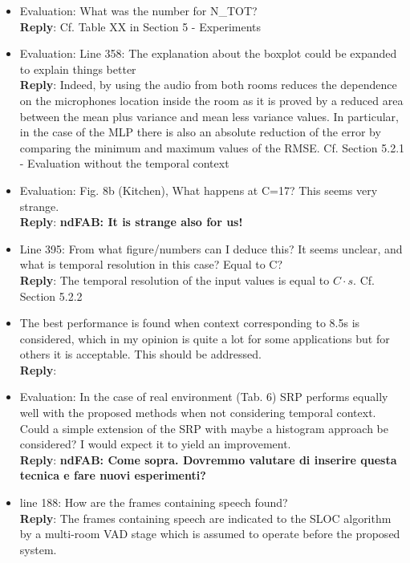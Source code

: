 \documentclass[11pt, technote, letterpaper, oneside, onecolumn]{IEEEtran}
\begin{document}
\begin{itemize}
\item Evaluation: What was the number for N\_TOT?\\
\textbf{Reply}: Cf. Table XX in Section 5 - Experiments

\item Evaluation: Line 358: The explanation about the boxplot could be expanded to explain things better\\
\textbf{Reply}: Indeed, by using the audio from both rooms reduces the dependence on the microphones location inside the room as it is proved by a reduced area between the mean plus variance and mean less variance values. In particular, in the case of the MLP there is also an absolute reduction of the error by comparing the minimum and maximum values of the RMSE. Cf. Section 5.2.1 - Evaluation without the temporal context

\item Evaluation: Fig. 8b (Kitchen), What happens at C=17? This seems very strange.\\
\textbf{Reply}: \textbf{ndFAB: It is strange also for us!}

\item Line 395: From what figure/numbers can I deduce this? It seems unclear, and what is temporal resolution in this case? Equal to C?\\
\textbf{Reply}: The temporal resolution of the input values is equal to $C\cdot s$. Cf. Section 5.2.2 

\item The best performance is found when context corresponding to 8.5s is considered, which in my opinion is quite a lot for some applications but for others it is acceptable. This should be addressed.\\
\textbf{Reply}: 

\item Evaluation: In the case of real environment (Tab. 6) SRP performs equally well with the proposed methods when not considering temporal context. Could a simple extension of the SRP with maybe a histogram approach be considered? I would expect it to yield an improvement.\\
\textbf{Reply}: \textbf{ndFAB: Come sopra. Dovremmo valutare di inserire questa tecnica e fare nuovi esperimenti?}

\item line 188: How are the frames containing speech found?\\
\textbf{Reply}: The frames containing speech are indicated to the SLOC algorithm by a multi-room VAD stage which is assumed to operate before the proposed system.


\end{itemize}
\end{document}
